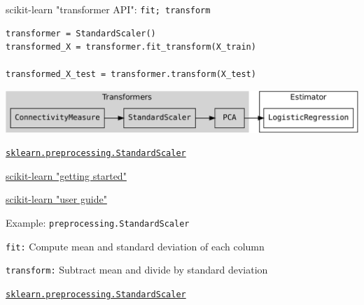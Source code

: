 \documentclass[presentation,mathserif,table]{beamer}
\begin{document}
\begin{frame}[label={sec:orgc43e9e6},fragile]{scikit-learn "transformer API": \texttt{fit; transform}}
 \begin{verbatim}
transformer = StandardScaler()
transformed_X = transformer.fit_transform(X_train)

transformed_X_test = transformer.transform(X_test)
\end{verbatim}
\vfill
\begin{center}
\includegraphics[width=.9\linewidth]{pipeline_transformer_estimator.pdf}
\end{center}

\href{https://scikit-learn.org/stable/modules/generated/sklearn.preprocessing.StandardScaler.html\#sklearn.preprocessing.StandardScaler}{\texttt{sklearn.preprocessing.StandardScaler}}

\href{https://scikit-learn.org/stable/getting\_started.html\#transformers-and-pre-processors}{scikit-learn "getting started"}

\href{https://scikit-learn.org/stable/data\_transforms.html}{scikit-learn "user guide"}
\end{frame}
\begin{frame}[label={sec:org91fc40c},fragile]{Example: \texttt{preprocessing.StandardScaler}}
 \begin{block}{\texttt{fit:}}
Compute mean and standard deviation of each column
\end{block}
\begin{block}{\texttt{transform:}}
Subtract mean and divide by standard deviation
\end{block}
\begin{structureenv} %
\href{https://scikit-learn.org/stable/modules/generated/sklearn.preprocessing.StandardScaler.html\#sklearn.preprocessing.StandardScaler}{\texttt{sklearn.preprocessing.StandardScaler}}
\end{structureenv}
\end{frame}
\end{document}
